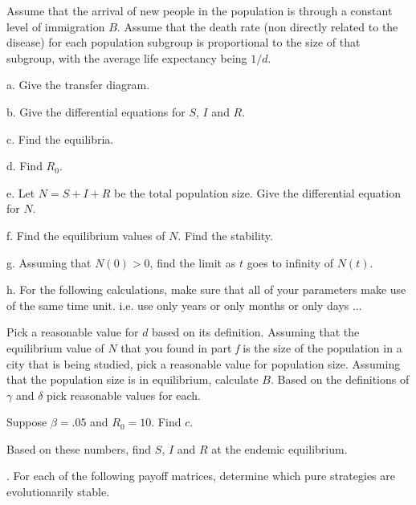 \documentclass[reqno,12pt]{amsart}
\begin{document}
Assume that the arrival of new people in the population is through
a constant level of immigration $B$.  Assume that the death rate
(non directly related to the disease) for each population subgroup
is proportional to the size of that subgroup, with the average life
expectancy being $1/d$.

\noindent
a.  Give the transfer diagram.

\noindent
b.  Give the differential equations for $S$, $I$ and $R$.

\noindent
c.  Find the equilibria.

\noindent
d.  Find $R_0$.

\noindent
e.  Let $N = S+I+R$ be the total population size.  Give
the differential equation for $N$.

\noindent
f.  Find the equilibrium values of $N$.  Find the stability.

\noindent
g.  Assuming that $N(0) > 0$, find the limit as $t$ goes to
infinity of $N(t)$.

\noindent
h.  For the following calculations, make sure that all of your
parameters make use of the same time unit.  i.e. use only years
or only months or only days ...

Pick a reasonable value for $d$ based on its definition.
Assuming that the equilibrium value of $N$ that you found in
part {\it f} is the size of the population in a city that is
being studied, pick a reasonable value for population size.
Assuming that the population size is in equilibrium, calculate
$B$.  Based on the definitions of $\gamma$ and $\delta$ pick
reasonable values for each.

Suppose $\beta = .05$ and $R_0 = 10$.  Find $c$.

Based on these numbers, find $S$, $I$ and $R$ at the endemic
equilibrium.

\vspace{1cm}

.  For each of the following payoff matrices, determine which pure
strategies are evolutionarily stable.
\end{document}
